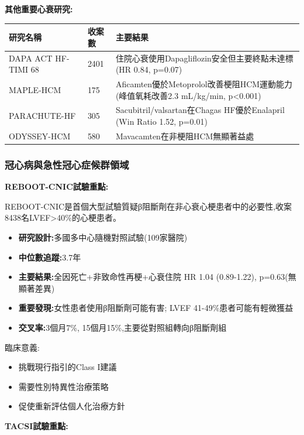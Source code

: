 \documentclass[12pt,a4paper]{article}
\begin{document}
\textbf{其他重要心衰研究:}

\begin{longtable}{p{3.5cm}p{2cm}p{8.5cm}}
\toprule
\textbf{研究名稱} & \textbf{收案數} & \textbf{主要結果} \\
\midrule
\endhead
DAPA ACT HF-TIMI 68 & 2401 & 住院心衰使用Dapagliflozin安全但主要終點未達標 (HR 0.84, p=0.07) \\
MAPLE-HCM & 175 & Aficamten優於Metoprolol改善梗阻HCM運動能力(峰值氧耗改善2.3 mL/kg/min, p<0.001) \\
PARACHUTE-HF & 305 & Sacubitril/valsartan在Chagas HF優於Enalapril (Win Ratio 1.52, p=0.01) \\
ODYSSEY-HCM & 580 & Mavacamten在非梗阻HCM無顯著益處 \\
\bottomrule
\end{longtable}

\subsubsection{冠心病與急性冠心症候群領域}

\textbf{REBOOT-CNIC試驗重點:}

REBOOT-CNIC是首個大型試驗質疑β阻斷劑在非心衰心梗患者中的必要性,收案8438名LVEF>40\%的心梗患者。

\begin{itemize}[nosep]
    \item \textbf{研究設計:}多國多中心隨機對照試驗(109家醫院)
    \item \textbf{中位數追蹤:}3.7年
    \item \textbf{主要結果:}全因死亡+非致命性再梗+心衰住院 HR 1.04 (0.89-1.22), p=0.63(無顯著差異)
    \item \textbf{重要發現:}女性患者使用β阻斷劑可能有害; LVEF 41-49\%患者可能有輕微獲益
    \item \textbf{交叉率:}3個月7\%, 15個月15\%,主要從對照組轉向β阻斷劑組
\end{itemize}

臨床意義:
\begin{itemize}[nosep]
    \item 挑戰現行指引的Class I建議
    \item 需要性別特異性治療策略
    \item 促使重新評估個人化治療方針
\end{itemize}

\vspace{0.5cm}

\textbf{TACSI試驗重點:}
\end{document}
